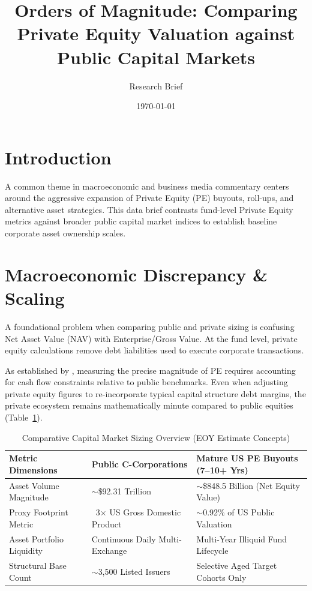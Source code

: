 \documentclass[11pt,a4paper]{article}
\title{Orders of Magnitude: Comparing Private Equity Valuation against Public Capital Markets}
\author{Research Brief}
\date{\today}
\begin{document}
\maketitle

\section{Introduction}
A common theme in macroeconomic and business media commentary centers around the aggressive expansion of Private Equity (PE) buyouts, roll-ups, and alternative asset strategies. This data brief contrasts fund-level Private Equity metrics against broader public capital market indices to establish baseline corporate asset ownership scales.

\section{Macroeconomic Discrepancy & Scaling}
A foundational problem when comparing public and private sizing is confusing Net Asset Value (NAV) with Enterprise/Gross Value. At the fund level, private equity calculations remove debt liabilities used to execute corporate transactions.

As established by \cite{kaplan2005private}, measuring the precise magnitude of PE requires accounting for cash flow constraints relative to public benchmarks. Even when adjusting private equity figures to re-incorporate typical capital structure debt margins, the private ecosystem remains mathematically minute compared to public equities (Table~\ref{tab:comparison}).

\begin{table}[h!]
\centering
\caption{Comparative Capital Market Sizing Overview (EOY Estimate Concepts)}
\label{tab:comparison}
\begin{tabular}{lll}
\toprule
\textbf{Metric Dimensions} & \textbf{Public C-Corporations} & \textbf{Mature US PE Buyouts (7--10+ Yrs)} \\
\midrule
Asset Volume Magnitude & $\sim$\$92.31 Trillion & $\sim$\$848.5 Billion (Net Equity Value) \\
Proxy Footprint Metric & ~3$\times$ US Gross Domestic Product & $\sim$0.92\% of US Public Valuation \\
Asset Portfolio Liquidity & Continuous Daily Multi-Exchange & Multi-Year Illiquid Fund Lifecycle \\
Structural Base Count & $\sim$3,500 Listed Issuers & Selective Aged Target Cohorts Only \\
\bottomrule
\end{tabular}
\end{table}
\end{document}
